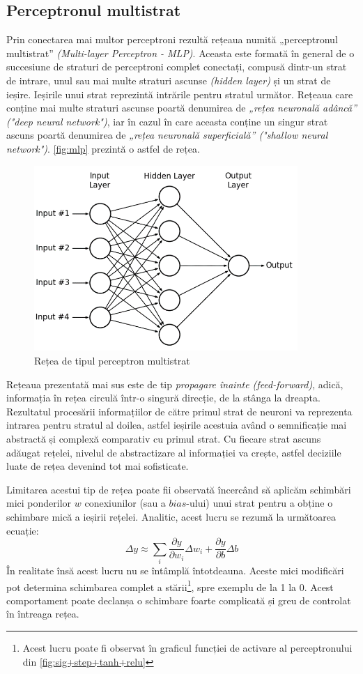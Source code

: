 \subsection{Perceptronul multistrat}
Prin conectarea mai multor perceptroni rezultă rețeaua numită „perceptronul multistrat” \textit{(Multi-layer Perceptron - MLP)}. Aceasta este formată în general de o succesiune de straturi de perceptroni complet conectați, compusă dintr-un strat de intrare, unul sau mai multe straturi ascunse \textit{(hidden layer)} și un strat de ieșire. Ieșirile unui strat reprezintă intrările pentru stratul următor. Rețeaua care conține mai multe straturi ascunse poartă denumirea de \textit{„rețea neuronală adâncă” ("deep neural network")}, iar în cazul în care aceasta conține un singur strat ascuns poartă denumirea de \textit{„rețea neuronală superficială” ("shallow neural network")}. \autoref{fig:mlp} prezintă o astfel de rețea. 
\begin{figure}[h]
\center
\includegraphics[width=10cm, keepaspectratio]{fig/cap2/mlp.png}
\caption{Rețea de tipul perceptron multistrat \cite{mlp-lakes}}
\label{fig:mlp}
\end{figure}

Rețeaua prezentată mai sus este de tip \textit{propagare înainte (feed-forward)}, adică, informația în rețea circulă într-o singură direcție, de la stânga la dreapta. Rezultatul procesării informațiilor de către primul strat de neuroni va reprezenta intrarea pentru stratul al doilea, astfel ieșirile acestuia având o semnificație mai abstractă și complexă comparativ cu primul strat. Cu fiecare strat ascuns adăugat rețelei, nivelul de abstractizare al informației va crește, astfel deciziile luate de rețea devenind tot mai sofisticate.

Limitarea acestui tip de rețea poate fii observată încercând să aplicăm schimbări mici ponderilor $w$ conexiunilor (sau a $bias$-ului) unui strat pentru a obține o schimbare mică a ieșirii rețelei. Analitic, acest lucru se rezumă la următoarea ecuație:
\begin{equation}
\Delta y\approx\sum_i\frac{\partial y}{\partial w_i}\Delta w_i + \frac{\partial y}{\partial b}\Delta b
\end{equation}
În realitate însă acest lucru nu se întâmplă întotdeauna. Aceste mici modificări pot determina schimbarea complet a stării\footnote{Acest lucru poate fi observat în graficul funcției de activare al perceptronului din \autoref{fig:sig+step+tanh+relu}}, spre exemplu de la 1 la 0. Acest comportament poate declanșa o schimbare foarte complicată și greu de controlat în întreaga rețea.

